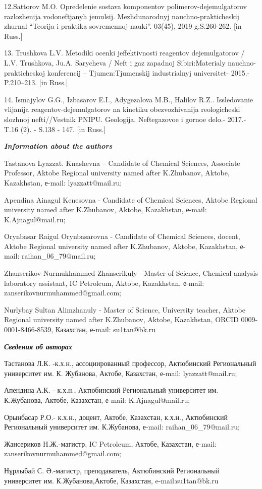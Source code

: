 12.Sattorov M.O. Opredelenie sostava komponentov
polimerov-dejemul\textquotesingle gatorov razlozhenija vodoneftjanyh
jemul\textquotesingle sij. Mezhdunarodnyj nauchno-prakticheskij zhurnal
``Teorija i praktika sovremennoj nauki''. 03(45), 2019 g.S.260-262.
{[}in Russ.{]}

13. Trushkova L.V. Metodiki ocenki jeffektivnosti reagentov
dejemul\textquotesingle gatorov / L.V. Trushkova, Ju.A. Sarycheva /
Neft\textquotesingle{} i gaz zapadnoj Sibiri:Materialy
nauchno-prakticheskoj konferencij -- Tjumen\textquotesingle:Tjumenskij
industrial\textquotesingle nyj universitet- 2015.- P.210--213. {[}in
Russ.{]}

14. Ismajylov G.G., Izbasarov E.I., Adygezalova M.B., Halilov R.Z..
Issledovanie vlijanija reagentov-dejemul\textquotesingle gatorov na
kinetiku obezvozhivanija reologicheski slozhnoj nefti//Vestnik PNIPU.
Geologija. Neftegazovoe i gornoe delo.- 2017.- T.16 (2). - S.138 - 147.
{[}in Russ.{]}

\emph{{\bfseries Information about the authors}}

Tastanova Lyazzat. Knashevna -- Candidate of Chemical Sciences,
Associate Professor, Aktobe Regional university named after K.Zhubanov,
Aktobe, Kazakhstan, е-mail: lyazzatt@mail.ru;

Apendina Ainagul Kenesovna - Candidate of Chemical Sciences, Aktobe
Regional university named after K.Zhubanov, Aktobe, Kazakhstan, е-mail:
K.Ajnagul@mail.ru;

Orynbasar Raigul Orynbasarovna - Candidate of Chemical Sciences, docent,
Aktobe Regional university named after K.Zhubanov, Aktobe, Kazakhstan,
е-mail: raihan\_06\_79@mail.ru;

Zhanserikov Nurmukhammed Zhanserikuly - Master of Science, Chemical
analysis laboratory assistant, IC Petroleum, Aktobe, Kazakhstan, е-mail:
zanserikovnurmuhammed@gmail.com;

Nurlybay Sultan Alimzhanuly - Master of Science, University teacher,
Aktobe Regional university named after K.Zhubanov, Aktobe, Kazakhstan,
ORCID 0009-0001-8466-8539, Казахстан, е-mail: su1tan@bk.ru

\emph{{\bfseries Сведения об авторах}}

Тастанова Л.К. -к.х.н., ассоциированный профессор, Актюбинский
Региональный университет им. К. Жубанова, Актобе, Казахстан, е-mail:
lyazzatt@mail.ru;

Апендина А.К. - к.х.н., Актюбинский Региональный университет им.
К.Жубанова, Актобе, Казахстан, е-mail: K.Ajnagul@mail.ru;

Орынбасар Р.О.- к.х.н., доцент, Актобе, Казахстан, к.х.н., Актюбинский
Региональный университет им. К.Жубанова, е-mail: raihan\_06\_79@mail.ru;

Жансериков Н.Ж.-магистр, IC Petroleum, Актобе, Казахстан, е-mail:
zanserikovnurmuhammed@gmail.com;

Нұрлыбай С. Ә.-магистр, преподаватель, Актюбинский Региональный
университет им. К.Жубанова,Актобе, Казахстан, e-mail:su1tan@bk.ru

